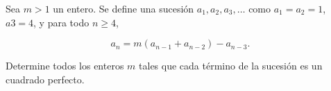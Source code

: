 Sea $m \gt 1$ un entero. Se define una sucesión $a_1, a_2, a_3, \dots$ como $a_1 = a_2 = 1$, $a3 = 4$,
y para todo $n \ge 4$,

\[a_n = m(a_{n - 1} + a_{n - 2}) - a_{n - 3}.\]

Determine todos los enteros $m$ tales que cada término de la sucesión es un cuadrado perfecto.